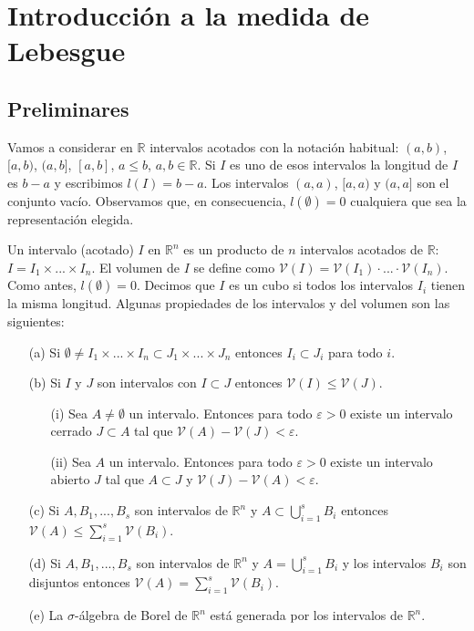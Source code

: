 \section{Introducción a la medida de Lebesgue}
\subsection{Preliminares}
Vamos a considerar en $\mathbb{R}$ intervalos acotados con la notación habitual: $(a, b)$, $[a, b)$, $(a, b]$, $[a, b]$, $a \leq b$, $a, b \in \mathbb{R}$. Si $I$ es uno de esos intervalos la longitud de $I$ es $b - a$ y escribimos $l(I) = b - a$. Los intervalos $(a, a)$, $[a, a)$ y $(a, a]$ son el conjunto vacío.
Observamos que, en consecuencia, $l(\emptyset) = 0$ cualquiera que sea la representación elegida.

Un intervalo (acotado) $I$ en $\mathbb{R}^n$ es un producto de $n$ intervalos acotados de $\mathbb{R}$: $I = I_1 \times ... \times I_n$. El volumen de $I$ se define como $\mathcal{V}(I) = \mathcal{V}(I_1) \cdot ... \cdot \mathcal{V}(I_n)$. Como antes, $l(\emptyset) = 0$. Decimos que $I$ es un cubo si todos los intervalos $I_i$ tienen la misma longitud. Algunas propiedades de los intervalos y del volumen son las siguientes:
\begin{enumerate}
    \item[(a)] Si $\emptyset \not = I_1 \times ... \times I_n \subset J_1 \times ... \times J_n$ entonces $I_i \subset J_i$ para todo $i$.
    \item[(b)] Si $I$ y $J$ son intervalos con $I \subset J$ entonces $\mathcal{V}(I) \leq \mathcal{V}(J)$.
          \begin{enumerate}
              \item[(i)] Sea $A \not = \emptyset$ un intervalo. Entonces para todo $\varepsilon > 0$ existe un intervalo cerrado $J \subset A$ tal que $\mathcal{V}(A) - \mathcal{V}(J) < \varepsilon$.
              \item[(ii)] Sea $A$ un intervalo. Entonces para todo $\varepsilon > 0$ existe un intervalo abierto $J$ tal que $A \subset J$ y $\mathcal{V}(J) - \mathcal{V}(A) < \varepsilon$.
          \end{enumerate}
    \item[(c)] Si $A, B_1,..., B_s$ son intervalos de $\mathbb{R}^n$ y $A \subset \bigcup_{i=1}^{s}{B_i}$ entonces $\mathcal{V}(A) \leq \sum_{i=1}^{s}{\mathcal{V}(B_i)}$.
    \item[(d)] Si $A, B_1,..., B_s$ son intervalos de $\mathbb{R}^n$ y $A = \bigcup_{i=1}^{s}{B_i}$ y los intervalos $B_i$ son disjuntos entonces $\mathcal{V}(A) = \sum_{i=1}^{s}{\mathcal{V}(B_i)}$.
    \item[(e)] La $\sigma$-álgebra de Borel de $\mathbb{R}^n$ está generada por los intervalos de $\mathbb{R}^n$.
\end{enumerate}
